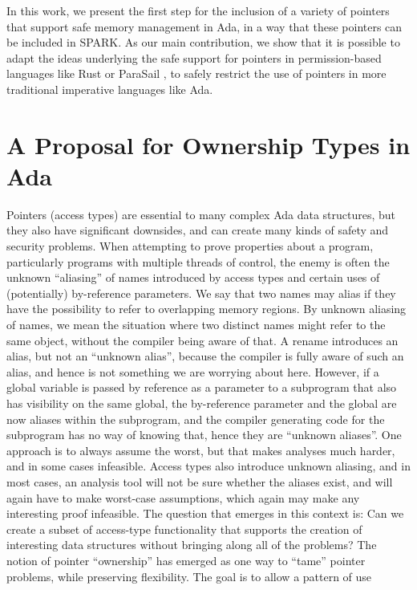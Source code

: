 \documentclass{llncs}
\begin{document}
\smallskip
In this work, we present the first step for the inclusion of a variety of pointers that support safe memory management in Ada, in a way that these pointers can be included in SPARK. As our main contribution, we show that it is possible to adapt the ideas underlying the safe support for pointers in permission-based languages like Rust \cite{Balasubramanian17} or ParaSail , to safely restrict the use of pointers in more traditional imperative languages like Ada. 



\section{A Proposal for Ownership Types in Ada}
Pointers (access types) are essential to many complex Ada data structures, but they also have significant downsides, and can create many kinds of safety and security problems.
When attempting to prove properties about a program, particularly programs with multiple threads of control, the enemy is often the unknown ``aliasing'' of names introduced by
access types and certain uses of (potentially) by-reference parameters. We say that two names may alias if they have the possibility to refer to overlapping memory regions.
By unknown aliasing of names, we mean the situation where two distinct names might refer to the same object, without the compiler being aware of that.  A rename introduces
an alias, but not an ``unknown alias'', because the compiler is fully aware of such an alias, and hence is not something we are worrying about here. However, if a global
variable is passed by reference as a parameter to a subprogram that also has visibility on the same global, the by-reference parameter and the global are now aliases within
the subprogram, and the compiler generating code for the subprogram has no way of knowing that, hence they are ``unknown aliases''.  One approach is to always assume the worst,
but that makes analyses much harder, and in some cases infeasible. Access types also introduce unknown aliasing, and in most cases, an analysis tool will not be
sure whether the aliases exist, and will again have to make worst-case assumptions, which again may make any interesting proof infeasible.
The question that emerges in this context is: Can we create a subset of access-type functionality that supports the creation of interesting data structures without bringing along
all of the problems? The notion of pointer ``ownership'' has emerged as one way to ``tame'' pointer problems, while preserving flexibility.  The goal is to allow a pattern of use
\end{document}
